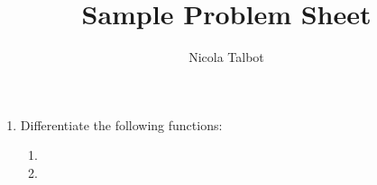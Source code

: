\documentclass[a4paper]{article}
\begin{document}
\title{Sample Problem Sheet}
\author{Nicola Talbot}
\maketitle

\begin{enumerate}



\item Differentiate the following functions:
\begin{enumerate}
\item {}

\item {}
\end{enumerate}
\end{enumerate}
\end{document}
